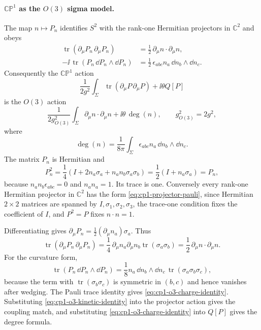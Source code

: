 \paragraph{\(\mathbb{CP}^1\) as the \(O(3)\) sigma model.}
The map \(n\mapsto P_n\) identifies \(S^2\) with the rank-one Hermitian
projectors in \(\mathbb C^2\) and obeys
\begin{align}
  \operatorname{tr}(\partial_\mu P_n\,\partial_\mu P_n)
  &=
  \frac12\,\partial_\mu n\cdot\partial_\mu n,
  \label{eq:cp1-o3-kinetic-identity}\\
  -\ii\,\operatorname{tr}(P_n\,\dd P_n\wedge\dd P_n)
  &=
  \frac12\,\epsilon_{abc}n_a\,\dd n_b\wedge\dd n_c .
  \label{eq:cp1-o3-charge-identity}
\end{align}
Consequently the \(\mathbb{CP}^1\) action
\[
  \frac1{2g^2}\int_\Sigma\operatorname{tr}(\partial_\mu P\,\partial_\mu P)
  +\ii\theta Q[P]
\]
is the \(O(3)\) action
\begin{equation}
  \frac1{2g_{O(3)}^2}\int_\Sigma
  \partial_\mu n\cdot\partial_\mu n+\ii\theta\,\deg(n),
  \qquad
  g_{O(3)}^2=2g^2,
  \label{eq:cp1-o3-coupling-match}
\end{equation}
where
\[
  \deg(n)=\frac1{8\pi}\int_\Sigma
  \epsilon_{abc}n_a\,\dd n_b\wedge\dd n_c .
\]
The matrix \(P_n\) is Hermitian and
\[
  P_n^2=\frac14(I+2n_a\sigma_a+n_an_b\sigma_a\sigma_b)
  =\frac12(I+n_a\sigma_a)=P_n,
\]
because \(n_an_b\epsilon_{abc}=0\) and \(n_an_a=1\).  Its trace is one.
Conversely every rank-one Hermitian projector in \(\mathbb C^2\) has the form
\eqref{eq:cp1-projector-pauli}, since Hermitian \(2\times2\) matrices are
spanned by \(I,\sigma_1,\sigma_2,\sigma_3\), the trace-one condition fixes the
coefficient of \(I\), and \(P^2=P\) fixes \(n\cdot n=1\).

Differentiating gives \(\partial_\mu P_n=\frac12(\partial_\mu n_a)\sigma_a\).
Thus
\[
  \operatorname{tr}(\partial_\mu P_n\,\partial_\mu P_n)
  =
  \frac14\,\partial_\mu n_a\partial_\mu n_b
  \operatorname{tr}(\sigma_a\sigma_b)
  =
  \frac12\,\partial_\mu n\cdot\partial_\mu n.
  \]
For the curvature form,
\[
  \operatorname{tr}(P_n\,\dd P_n\wedge\dd P_n)
  =
  \frac18 n_a\,\dd n_b\wedge\dd n_c\,
  \operatorname{tr}(\sigma_a\sigma_b\sigma_c),
\]
because the term with \(\operatorname{tr}(\sigma_b\sigma_c)\) is symmetric in
\((b,c)\) and hence vanishes after wedging.  The Pauli trace identity gives
\eqref{eq:cp1-o3-charge-identity}.  Substituting
\eqref{eq:cp1-o3-kinetic-identity} into the projector action gives the coupling
match, and substituting \eqref{eq:cp1-o3-charge-identity} into \(Q[P]\) gives
the degree formula.

